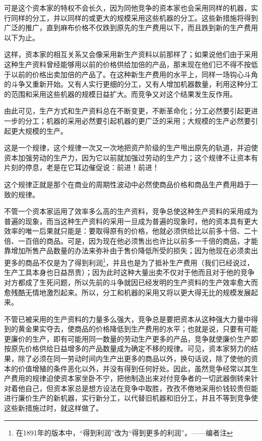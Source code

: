 \documentclass[a4paper,twoside,12pt]{ctexart}
\begin{document}
可是这个资本家的特权不会长久，因为同他竞争的资本家也会采用同样的机器，实行同样的分工，并以同样的或更大的规模采用这些机器的分工。这些新措施将得到广泛的推广，直到麻布价格不仅跌到原先的生产费用以下，而且跌到新的生产费用以下为止。

这样，资本家的相互关系又会像采用新生产资料以前那样了；如果说他们由于采用这种生产资料曾经能够用以前的价格供给加倍的产品，那末现在他们已不得不按低于以前的价格出卖加倍的产品了。在这种新生产费用的水平上，同样一场钩心斗角的斗争又重新开始。又有人实行更细的分工，又有人增加机器数量，利用这种分工的范围和采用这些机器的规模日益扩大。而竞争又对这个结果发生反作用。

由此可见，生产方式和生产资料总在不断变更，不断革命化；分工必然要引起更进一步的分工；机器的采用必然要引起机器的更广泛的采用；大规模的生产必然要引起更大规模的生产。

这是一个规律，这个规律一次又一次地把资产阶级的生产甩出原先的轨道，并迫使资本加强劳动的生产力，因为它以前就加强过劳动的生产力；这个规律不让资本有片刻的停息，老是在它耳边催促说：前进！前进！

这个规律正就是那个在商业的周期性波动中必然使商品价格和商品生产费用趋于一致的规律。

不管一个资本家运用了效率多么高的生产资料，竞争总使这种生产资料的采用成为普遍的现象，而当这种生产资料的采用一旦成为普遍的现象时，他的资本具有更大效率的唯一后果就只能是：要取得原有的价格，他就必须供给比以前多十倍、二十倍、一百倍的商品。可是，因为现在他必须售出也许比以前多一千倍的商品，才能靠增加所售产品数量的办法来弥补由于售价降低所受的损失；因为他现在必须卖出更多的商品不仅是为了得到利润\footnote{在1891年的版本中，“得到利润”改为“得到更多的利润”。——编者注}，并且也是为了抵补生产费用（我们已经说过，生产工具本身也日益昂贵）；因为此时这种大量出卖不仅对于他而且对于他的竞争对方都成了生死问题，所以先前的斗争就因已经发明的生产资料的生产效率愈大而愈残酷无情地激烈起来。所以，分工和机器的采用又将以更大得无比的规模发展起来。

不管已被采用的生产资料的力量多么强大，竞争总是要把资本从这种强大力量中得到的黄金果实夺去，使商品的价格降低到生产费用的水平；也就是说，只要有可能更廉价的生产，即有可能用同一数量的劳动生产更多的产品，竞争就使廉价生产即按原先价格供给日益增多的产品数量成为确定不移的规律。可见，资本家努力的结果，除了必须在同一劳动时间内生产出更多的商品以外，换句话说，除了使他的资本的价值增殖的条件恶化以外，并没有得到任何好处。因此，虽然竞争经常以其生产费用的规律迫使资本家坐卧不宁，把他制造出来对付竞争者的一切武器倒转来针对着他自己，但资本家总是想方设法在竞争中取胜，孜孜不倦地采用价钱较贵但能进行廉价生产的新机器，实行新分工，以代替旧机器和旧分工，并且不等到竞争使这些新措施过时，就这样做了。
\end{document}
